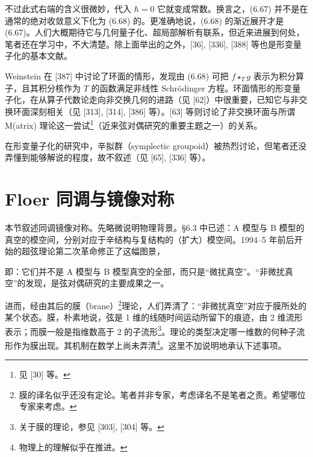 
不过此式右端的含义很微妙，代入 $\hbar=0$ 它就变成常数。换言之，(6.67) 并不是在通常的绝对收敛意义下化为 (6.68) 的。更准确地说，(6.68) 的渐近展开才是 (6.67)。人们大概期待它与几何量子化、超局部解析有联系，但近来进展到何处，笔者还在学习中，不大清楚。除上面举出的之外，[36], [336], [388] 等也是形变量子化的基本文献。

Weinstein 在 [387] 中讨论了环面的情形，发现由 (6.68) 可把 $f\star_T g$ 表示为积分算子，且其积分核作为 $T$ 的函数满足非线性 Schrödinger 方程。环面情形的形变量子化，在从算子代数论走向非交换几何的进路（见 [62]）中很重要，已知它与非交换环面深刻相关（见 [313], [314], [386] 等）。[63] 等则讨论了非交换环面与所谓 M(atrix) 理论这一尝试\footnote{见 [30] 等。}（近来弦对偶研究的重要主题之一）的关系。

在形变量子化的研究中，辛拟群（symplectic groupoid）被热烈讨论，但笔者还没弄懂到能够解说的程度，故不叙述（见 [65], [336] 等）。

\section{Floer 同调与镜像对称}


本节叙述同调镜像对称。先略微说明物理背景。§6.3 中已述：A 模型与 B 模型的真空的模空间，分别对应于辛结构与复结构的（扩大）模空间。1994–5 年前后开始的超弦理论第二次革命修正了这幅图景，

即：它们并不是 A 模型与 B 模型真空的全部，而只是“微扰真空”。“非微扰真空”的发现，是弦对偶研究的主要成果之一。

进而，经由其后的膜（brane）\footnote{膜的译名似乎还没有定论。笔者并非专家，考虑译名不是笔者之责。希望哪位专家来考虑。}理论，人们弄清了：“非微扰真空”对应于膜所处的某个状态。膜，朴素地说，弦是 1 维的线随时间运动所留下的痕迹，由 2 维流形表示；而膜一般是指维数高于 2 的子流形\footnote{关于膜的理论，参见 [303], [304] 等。}。理论的类型决定哪一维数的何种子流形作为膜出现。其机制在数学上尚未弄清\footnote{物理上的理解似乎在推进。}。这里不加说明地承认下述事项。

